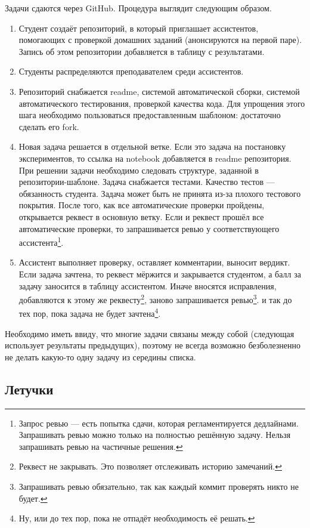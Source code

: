 Задачи сдаются через GitHub. Процедура выглядит следующим образом.
\begin{enumerate}
    \item Студент создаёт репозиторий, в который приглашает ассистентов, помогающих с проверкой домашних заданий (анонсируются на первой паре). Запись об этом репозитории добавляется в таблицу с результатами.
    \item Студенты распределяются преподавателем среди ассистентов.
    \item Репозиторий снабжается readme, системой автоматической сборки, системой автоматического тестирования, проверкой качества кода. Для упрощения этого шага необходимо пользоваться предоставленным шаблоном: достаточно сделать его fork.
    \item Новая задача решается в отдельной ветке. Если это задача на постановку экспериментов, то ссылка на notebook добавляется в readme репозитория. При решении задачи необходимо следовать структуре, заданной в репозитории-шаблоне. Задача снабжается тестами. Качество тестов --- обязанность студента. Задача может быть не принята из-за плохого тестового покрытия. После того, как все автоматические проверки пройдены, открывается реквест в основную ветку. Если и реквест прошёл все автоматические проверки, то запрашивается ревью у соответствующего ассистента\footnote{Запрос ревью --- есть попытка сдачи, которая регламентируется дедлайнами. Запрашивать ревью можно только на полностью решённую задачу. Нельзя запрашивать ревью на частичные решения.}.
    \item Ассистент выполняет проверку, оставляет комментарии, выносит вердикт. Если задача зачтена, то реквест мёржится и закрывается студентом, а балл за задачу заносится в таблицу ассистентом. Иначе вносятся исправления, добавляются к этому же реквесту\footnote{Реквест не закрывать. Это позволяет отслеживать историю замечаний.}, заново запрашивается ревью\footnote{Запрашивать ревью обязательно, так как каждый коммит проверять никто не будет.}. и так до тех пор, пока задача не будет зачтена\footnote{Ну, или до тех пор, пока не отпадёт необходимость её решать.}.
\end{enumerate}

Необходимо иметь ввиду, что многие задачи связаны между собой (следующая использует результаты предыдущих), поэтому не всегда возможно безболезненно не делать какую-то одну задачу из середины списка.

\subsection{Летучки}

